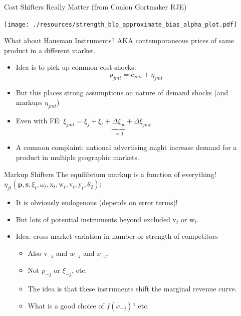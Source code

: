 \documentclass[aspectratio=169,10pt]{beamer}
\begin{document}
\begin{frame}{Cost Shifters Really Matter (from Conlon Gortmaker RJE)}
\begin{center}
    \texttt{[image: ./resources/strength\_blp\_approximate\_bias\_alpha\_plot.pdf]}
\end{center}
\end{frame}


\begin{frame}{What about Hausman Instruments?}
AKA contemporaneous prices of same product in a different market.
\begin{itemize}
    \item Idea is to pick up common cost shocks:
     $$p_{jmt} = c_{jmt} + \eta_{jmt}$$
     \item But this places strong assumptions on nature of demand shocks (and markups $ \eta_{jmt}$)
     \item Even with FE: $\xi_{jmt} = \xi_j + \xi_t + \underbrace{\Delta \xi_{jt}}_{=0} + \Delta \xi_{jmt}$
     \item A common complaint: national advertising might increase demand for a product in multiple geographic markets.
\end{itemize}
\end{frame}



\begin{frame}{Markup Shifters}
The equilibrium markup is a function of \alert{everything!} $\eta_{jt}(\symbf{p},\symbf{s},\xi_t,\omega_t,\textrm{x}_{t},\textrm{w}_{t},\textrm{v}_t,\textrm{y}_t,\theta_2)$:
\begin{itemize}
\item It is obviously \alert{endogenous} (depends on error terms)!
\item But lots of potential instruments beyond \alert{excluded} $\textrm{v}_t$ or $\textrm{w}_t$.
\item Idea: cross-market variation in number or strength of competitors
\begin{itemize}
\item Also $\textrm{v}_{-j}$ and $w_{-j}$ and $x_{-j}$.
\item Not $p_{-j}$ or $\xi_{-j}$, etc.
\item The idea is that these instruments shift the \alert{marginal revenue curve}.
\item What is a good choice of $f(x_{-j})$? etc.
\end{itemize}
\end{itemize}
\end{frame}
\end{document}
